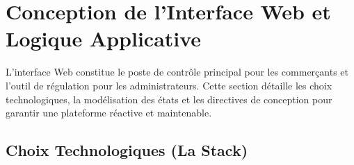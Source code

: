 \newpage





\section{Conception de l'Interface Web et Logique Applicative}
\label{sec:interface_web}

L'interface Web constitue le poste de contrôle principal pour les commerçants et l'outil de régulation pour les administrateurs. Cette section détaille les choix technologiques, la modélisation des états et les directives de conception pour garantir une plateforme réactive et maintenable.

\subsection{Choix Technologiques (La Stack)}

